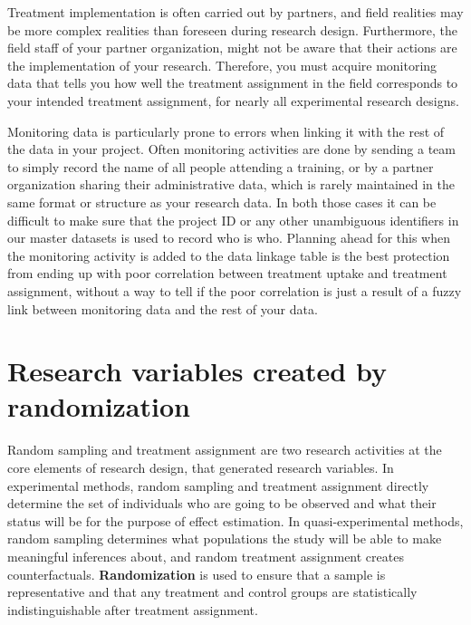 Treatment implementation is often carried out by partners,
and field realities may be more complex realities than foreseen during research design.
Furthermore, the field staff of your partner organization,
might not be aware that their actions are the implementation of your research.
Therefore, you must acquire monitoring data that
tells you how well the treatment assignment in the field
corresponds to your intended treatment assignment,
for nearly all experimental research designs.

Monitoring data is particularly prone to errors
when linking it with the rest of the data in your project.
Often monitoring activities are done by
sending a team to simply record the name of all people attending a training,
or by a partner organization sharing their administrative data,
which is rarely maintained in the same format or structure as your research data.
In both those cases it can be difficult to make sure that
the project ID or any other unambiguous identifiers in our master datasets
is used to record who is who.
Planning ahead for this when the monitoring activity is added to the data linkage table
is the best protection from ending up with poor correlation
between treatment uptake and treatment assignment,
without a way to tell if the poor correlation is just
a result of a fuzzy link between monitoring data and the rest of your data.


\section{Research variables created by randomization}

Random sampling and treatment assignment are two research activities
at the core elements of research design,
that generated research variables.
In experimental methods,
random sampling and treatment assignment directly determine
the set of individuals who are going to be observed
and what their status will be for the purpose of effect estimation.
In quasi-experimental methods,
random sampling determines what populations the study
will be able to make meaningful inferences about,
and random treatment assignment creates counterfactuals.
\textbf{Randomization}
is used to ensure that a sample is representative and
that any treatment and control groups are statistically indistinguishable
after treatment assignment.

